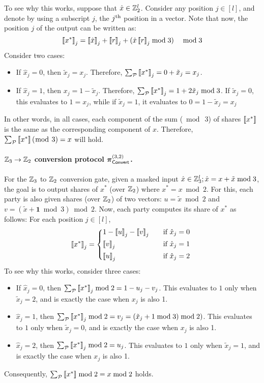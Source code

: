 \noindent To see why this works, suppose that $\hat{x} \in \mathbb{Z}_2^l$. Consider any position $j \in [l]$, and denote by using a subscript $j$, the $j^{\textnormal{th}}$ position in a vector. Note that now, the position $j$ of the output can be written as:
\[
    \left\llbracket x^* \right\rrbracket_j = \left\llbracket \hat{x} \right\rrbracket_j + \left\llbracket r \right\rrbracket_j + (\hat{x}\left\llbracket r \right\rrbracket_j\bmod 3) \quad \bmod 3
\]
Consider two cases:
\begin{itemize}
\item If $\hat{x}_j = 0$, then $\tilde{x}_j = x_j$. Therefore, $\sum_{\mathcal{P}} \left\llbracket x^* \right\rrbracket_j = 0 + \tilde{x}_j = x_j$.

\item If $\hat{x}_j = 1$, then $x_j = 1 - \tilde{x}_j$. Therefore, $\sum_{\mathcal{P}} \left\llbracket x^* \right\rrbracket_j = 1 + 2\tilde{x}_j \bmod 3$. If $\tilde{x}_j = 0$, this evaluates to $1 = x_j$, while if $\tilde{x}_j = 1$, it evaluates to $0 = 1 - \tilde{x}_j = x_j$
\end{itemize}
In other words, in all cases, each component of the sum ($\bmod~3$) of shares $\left\llbracket x^* \right\rrbracket$ is the same as the corresponding component of $x$. Therefore, $\sum_{\mathcal{P}} \left\llbracket x^* \right\rrbracket (\bmod~3) = x$ will hold.


\paragraph{$\mathbb{Z}_3 \to \mathbb{Z}_2$ conversion protocol $\boldsymbol{\pi}_{\textsf{Convert}}^{(3,2)}$.}
For the $\mathbb{Z}_3$ to $\mathbb{Z}_2$ conversion gate, given a masked input $\hat{x} \in \mathbb{Z}_3^l; \hat{x} = x + \tilde{x} \bmod 3$, the goal is to output shares of $x^*$ (over $\mathbb{Z}_2$) where $x^*  = x \bmod 2$. For this, each party is also given shares (over $\mathbb{Z}_2$) of two vectors: $u = \tilde{x} \bmod 2$ and $v = (\tilde{x} + \textbf{1} \bmod 3) \bmod 2$. Now, each party computes its share of $x^*$ as follows: For each position $j \in [l]$,
\[
\share{x^*}_j = 
\begin{cases*}
       1 - \share{u}_j - \share{v}_j  & \quad if $\hat{x}_j = 0$ \\
       \share{v}_j & \quad if $\hat{x}_j = 1$ \\
       \share{u}_j & \quad if $\hat{x}_j = 2$
\end{cases*}
\]
To see why this works, consider three cases:
\begin{itemize}
\item If $\hat{x}_j = 0$, then $\sum_{\mathcal{P}} \left\llbracket x^* \right\rrbracket_j \bmod 2 = 1 - u_j - v_j$. This evaluates to $1$ only when $\tilde{x}_j = 2$, and is exactly the case when $x_j$ is also 1.

\item $\hat{x}_j = 1$, then $\sum_{\mathcal{P}} \left\llbracket x^* \right\rrbracket_j \bmod 2 = v_j = (\tilde{x}_j + 1 \bmod 3) \bmod 2)$. This evaluates to $1$ only when $\tilde{x}_j = 0$, and is exactly the case when $x_j$ is also 1.

\item $\hat{x}_j = 2$, then $\sum_{\mathcal{P}} \left\llbracket x^* \right\rrbracket_j \bmod 2 = u_j$. This evaluates to $1$ only when $\tilde{x}_j = 1$, and is exactly the case when $x_j$ is also 1.
\end{itemize}
Consequently, $\sum_{\mathcal{P}} \left\llbracket x^* \right\rrbracket \bmod 2 = x \bmod 2$ holds.

